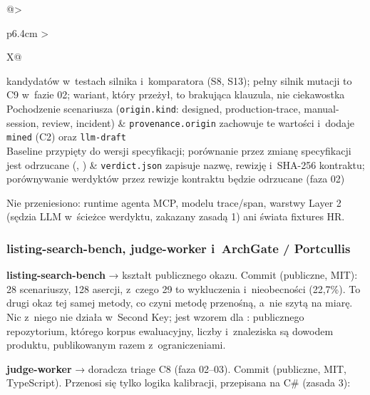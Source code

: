 {\begin{xltabular}{\linewidth}{@{}>{\raggedright\arraybackslash}p{6.4cm} >{\raggedright\arraybackslash}X@{}}
kandydatów w~testach silnika i~komparatora (S8, S13); pełny silnik mutacji to C9 w~fazie 02;
wariant, który przeżył, to brakująca klauzula, nie ciekawostka \\
Pochodzenie scenariusza (\texttt{origin.kind}: designed, production-trace, manual-session,
review, incident) & \texttt{provenance.origin} zachowuje te wartości i~dodaje \texttt{mined}
(C2) oraz \texttt{llm-draft} \\
Baseline przypięty do wersji specyfikacji; porównanie przez zmianę specyfikacji jest
odrzucane (,
) & \texttt{verdict.json} zapisuje
nazwę, rewizję i~SHA-256 kontraktu; porównywanie werdyktów przez rewizje kontraktu będzie
odrzucane (faza 02) \\
\end{xltabular}
}

Nie przeniesiono: runtime agenta MCP, modelu trace/span, warstwy Layer 2 (sędzia LLM w~ścieżce werdyktu, zakazany zasadą 1) ani świata fixtures HR.

\subsubsection{listing-search-bench, judge-worker i~ArchGate / Portcullis}

\textbf{listing-search-bench} → kształt publicznego okazu. Commit 
(publiczne, MIT): 28 scenariuszy, 128 asercji, z~czego 29 to wykluczenia i~nieobecności
(22,7\%). To drugi okaz tej samej metody, co czyni metodę przenośną, a~nie szytą na
miarę. Nic z~niego nie działa w~Second Key; jest wzorem dla
: publicznego repozytorium, którego korpus
ewaluacyjny, liczby i~znaleziska są dowodem produktu, publikowanym razem z~ograniczeniami.

\textbf{judge-worker} → doradcza triage C8 (faza 02–03). Commit 
(publiczne, MIT, TypeScript). Przenosi się tylko logika kalibracji, przepisana na C\#
(zasada 3):

